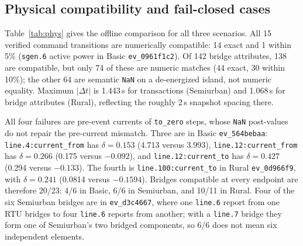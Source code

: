 \documentclass[conference]{IEEEtran}
\begin{document}
\subsection{Physical compatibility and fail-closed cases}
\label{sec:phys}
Table~\ref{tab:phys} gives the offline comparison for all three scenarios.
All 15 verified command transitions are numerically compatible: 14 exact and 1 within 5\% (\texttt{sgen.6} active power in Basic \texttt{ev\_0961f1c2}).
Of 142 bridge attributes, 138 are compatible, but only 74 of these are numeric matches (44 exact, 30 within 10\%); the other 64 are semantic \texttt{NaN} on a de-energized island, not numeric equality.
Maximum $|\Delta t|$ is 1.443\,s for transactions (Semiurban) and 1.068\,s for bridge attributes (Rural), reflecting the roughly 2\,s snapshot spacing there.

All four failures are pre-event currents of \texttt{to\_zero} steps, whose \texttt{NaN} post-values do not repair the pre-current mismatch.
Three are in Basic \texttt{ev\_564bebaa}: \texttt{line.4:current\_from} has $\delta=0.153$ (4.713 versus 3.993), \texttt{line.12:current\_from} has $\delta=0.266$ (0.175 versus $-0.092$), and \texttt{line.12:current\_to} has $\delta=0.427$ (0.294 versus $-0.133$).
The fourth is \texttt{line.100:current\_to} in Rural \texttt{ev\_0d966f9}, with $\delta=0.241$ (0.0814 versus $-0.1594$).
Bridges compatible at every endpoint are therefore 20/23: 4/6 in Basic, 6/6 in Semiurban, and 10/11 in Rural.
Four of the six Semiurban bridges are in \texttt{ev\_d3c4667}, where one \texttt{line.6} report from one RTU bridges to four \texttt{line.6} reports from another; with a \texttt{line.7} bridge they form one of Semiurban's two bridged components, so 6/6 does not mean six independent elements.
\end{document}
